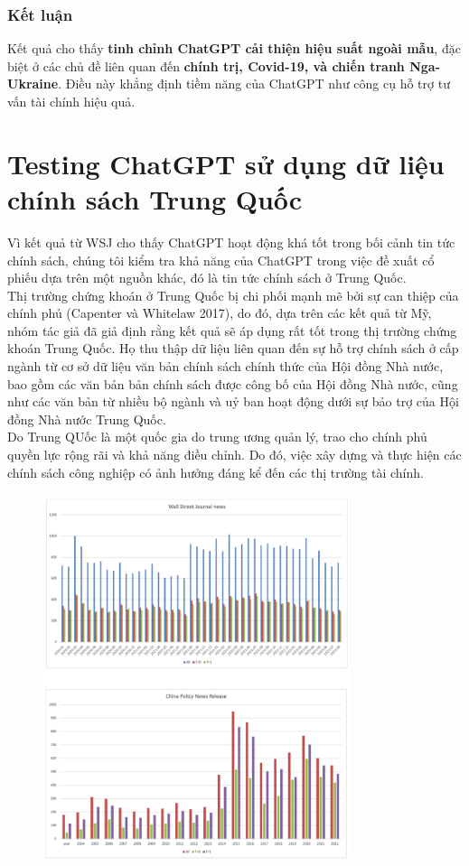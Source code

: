 \documentclass[a4paper,12pt]{article}
\begin{document}
\subsubsection*{Kết luận}
Kết quả cho thấy \textbf{tinh chỉnh ChatGPT cải thiện hiệu suất ngoài mẫu}, đặc biệt ở các chủ đề liên quan đến \textbf{chính trị, Covid-19, và chiến tranh Nga-Ukraine}. Điều này khẳng định tiềm năng của ChatGPT như công cụ hỗ trợ tư vấn tài chính hiệu quả.

\section{Testing ChatGPT sử dụng dữ liệu chính sách Trung Quốc}
Vì kết quả từ WSJ cho thấy ChatGPT hoạt động khá tốt trong bối cảnh tin tức chính sách, chúng tôi kiểm tra khả năng của ChatGPT trong việc đề xuất cổ phiếu dựa trên một nguồn khác, đó là tin tức chính sách ở Trung Quốc.
\\ Thị trường chứng khoán ở Trung Quốc bị chi phối mạnh mẽ bởi sự can thiệp của chính phủ (Capenter và Whitelaw 2017), do đó, dựa trên các kết quả từ Mỹ, nhóm tác giả đã giả định rằng kết quả sẽ áp dụng rất tốt trong thị trường chứng khoán Trung Quốc. Họ thu thập dữ liệu liên quan đến sự hỗ trợ chính sách ở cấp ngành từ cơ sở dữ liệu văn bản chính sách chính thức của Hội đồng Nhà nước, bao gồm các văn bản bản chính sách được công bố của Hội đồng Nhà nước, cũng như các văn bản từ nhiều bộ ngành và uỷ ban hoạt động dưới sự bảo trợ của Hội đồng Nhà nước Trung Quốc. 
\\Do Trung QUốc là một quốc gia do
trung ương quản lý, trao cho chính phủ quyền lực rộng rãi và khả năng điều chỉnh. Do đó, việc xây dựng và thực hiện các chính sách công nghiệp có ảnh hưởng đáng kể đến các thị trường tài chính. 
\begin{figure}[H]
    \centering
    \includegraphics[width=0.8\textwidth]{fig/fig2.png}
    \
\end{figure}
\end{document}
